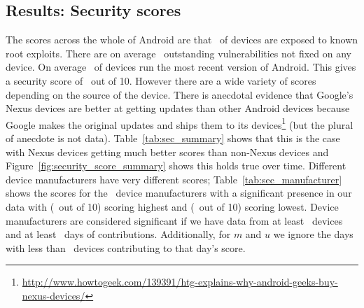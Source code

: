 
\subsection{Results: Security scores}\label{sec:security_scoring:results}
The scores across the whole of Android are that \daMeanInsecurityPerc\ of devices are exposed to known root exploits.
There are on average \daMeanOutstandingVulnerabilities\ outstanding vulnerabilities not fixed on any device.
On average \daUpdatednessPerc\ of devices run the most recent version of Android.
This gives a security score of \daSecurityScore\ out of 10.
\daTabSecScoressummary
However there are a wide variety of scores depending on the source of the device.
There is anecdotal evidence that Google's Nexus devices are better at getting updates than other Android devices because Google makes the original updates and ships them to its devices\footnote{\url{http://www.howtogeek.com/139391/htg-explains-why-android-geeks-buy-nexus-devices/}} (but the plural of anecdote is not data).
Table~\ref{tab:sec_summary} shows that this is the case with Nexus devices getting much better scores than non-Nexus devices and Figure~\ref{fig:security_score_summary} shows this holds true over time.
\daTabSecScoresmanufacturer
Different device manufacturers have very different scores; Table~\ref{tab:sec_manufacturer} shows the scores for the \daNumSigManufacturers\ device manufacturers with a significant presence in our data with \emph{\daSecScoreBestmanufacturer} (\daSecScoreBestmanufacturerScore\ out of 10) scoring highest and \emph{\daSecScoreWorstmanufacturer} (\daSecScoreWorstmanufacturerScore\ out of 10) scoring lowest.
Device manufacturers are considered significant if we have data from at least \daSigNumDevices\ devices and at least \daSigNumDeviceDays\ days of contributions.
Additionally, for $m$ and $u$ we ignore the days with less than \daSigNumDevicesDay\ devices contributing to that day's score.

